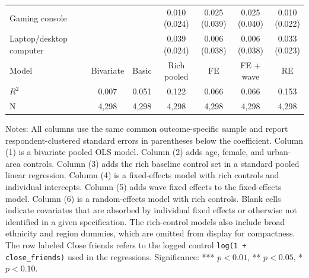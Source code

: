 \begin{table}[!htbp]
\begin{tabular}{p{}cccccc}
\\
Gaming console &  &  & \shortstack[c]{0.010 \\[-0.35ex] (0.024)} & \shortstack[c]{0.025 \\[-0.35ex] (0.039)} & \shortstack[c]{0.025 \\[-0.35ex] (0.040)} & \shortstack[c]{0.010 \\[-0.35ex] (0.022)}
\\
Laptop/desktop computer &  &  & \shortstack[c]{0.039 \\[-0.35ex] (0.024)} & \shortstack[c]{0.006 \\[-0.35ex] (0.038)} & \shortstack[c]{0.006 \\[-0.35ex] (0.038)} & \shortstack[c]{0.033 \\[-0.35ex] (0.023)}
\\
\hline
Model & Bivariate & Basic & Rich pooled & FE & FE + wave & RE
\\
$R^2$ & 0.007 & 0.051 & 0.122 & 0.066 & 0.066 & 0.153
\\
N & 4,298 & 4,298 & 4,298 & 4,298 & 4,298 & 4,298
\\
\hline
\end{tabular}
\renewcommand{\arraystretch}{1}
\begin{minipage}{0.97\textwidth}
\footnotesize Notes: All columns use the same common outcome-specific sample and report respondent-clustered standard errors in parentheses below the coefficient. Column (1) is a bivariate pooled OLS model. Column (2) adds age, female, and urban-area controls. Column (3) adds the rich baseline control set in a standard pooled linear regression. Column (4) is a fixed-effects model with rich controls and individual intercepts. Column (5) adds wave fixed effects to the fixed-effects model. Column (6) is a random-effects model with rich controls. Blank cells indicate covariates that are absorbed by individual fixed effects or otherwise not identified in a given specification. The rich-control models also include broad ethnicity and region dummies, which are omitted from display for compactness. The row labeled Close friends refers to the logged control \texttt{log(1 + close\_friends)} used in the regressions. Significance: *** \(p < 0.01\), ** \(p < 0.05\), * \(p < 0.10\).
\end{minipage}
\end{table}
